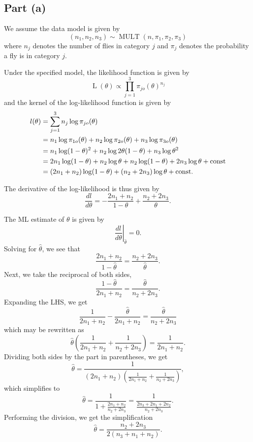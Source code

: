 \documentclass[
]{article}
\begin{document}
\hypertarget{part-a-3}{%
\subsection{Part (a)}\label{part-a-3}}


We assume the data model is given by \[
  (n_1,n_2,n_3) \sim \operatorname{MULT}(n, \pi_1, \pi_2, \pi_3)
\] where \(n_j\) denotes the number of flies in category \(j\) and
\(\pi_j\) denotes the probability a fly is in category \(j\).

Under the specified model, the likelihood function is given by \[
  \operatorname{L}(\theta) \propto \prod_{j=1}^{3} \pi_{j o}(\theta)^{n_j}
\] and the kernel of the log-likelihood function is given by
\begin{align*}
  l(\theta)
    &= \sum_{j=1}^{3} n_j \log \pi_{j o}(\theta)\\
    &= n_1 \log \pi_{1 o}(\theta) +
       n_2 \log \pi_{2 o}(\theta) +
       n_3 \log \pi_{3 o}(\theta)\\
    &= n_1 \log (1-\theta)^2 +
       n_2 \log 2 \theta(1-\theta) +
       n_3 \log \theta^2\\
    &= 2 n_1 \log (1-\theta) + n_2 \log \theta + n_2 \log(1-\theta)
      + 2 n_3 \log \theta + \rm{const}\\
    &= (2 n_1 + n_2) \log (1-\theta) + ( n_2 + 2 n_3)\log \theta + \rm{const}.
\end{align*}

The derivative of the log-likelihood is thus given by \[
  \frac{d l}{d \theta} =
    -\frac{2 n_1 + n_2}{1-\theta} + 
    \frac{n_2 + 2 n_3}{\theta}.
\]

The ML estimate of \(\theta\) is given by \[
  \left. \frac{d l}{d \theta} \right\vert_{\hat\theta} = 0.
\] Solving for \(\hat\theta\), we see that \[
  \frac{2 n_1 + n_2}{1-\hat\theta} = \frac{n_2 + 2 n_3}{\hat\theta}.
\] Next, we take the reciprocal of both sides, \[
  \frac{1-\hat\theta}{2 n_1 + n_2} = \frac{\hat\theta}{n_2 + 2 n_3}.
\] Expanding the LHS, we get \[
  \frac{1}{2 n_1 + n_2} - \frac{\hat\theta}{2 n_1 + n_2} = \frac{\hat\theta}{n_2 + 2 n_3}
\] which may be rewritten as \[
  \hat\theta \left(\frac{1}{2 n_1 + n_2} + \frac{1}{n_2 + 2 n_3}\right) = \frac{1}{2 n_1 + n_2}.
\] Dividing both sides by the part in parentheses, we get \[
  \hat\theta = \frac{1}{(2 n_1 + n_2) \left(\frac{1}{2 n_1 + n_2} + \frac{1}{n_2 + 2 n_3}\right)},
\] which simplifies to \[
  \hat\theta = \frac{1}{1 + \frac{2 n_1 + n_2}{n_2 + 2 n_3}} = \frac{1}{\frac{2 n_3 + 2 n_1 + 2 n_2}{n_2 + 2 n_3}}.
\] Performing the division, we get the simplification \[
  \hat\theta = \frac{n_2 + 2 n_3}{2(n_3 + n_1 + n_2)}.
\]
\end{document}
